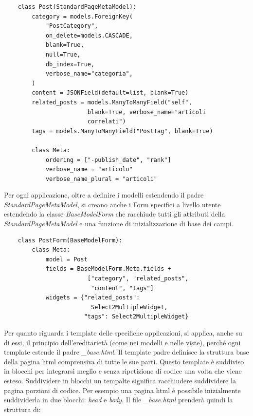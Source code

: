 \documentclass[12pt,a4paper]{article}
\begin{document}
\begin{verbatim}
    class Post(StandardPageMetaModel):
        category = models.ForeignKey(
            "PostCategory",
            on_delete=models.CASCADE,
            blank=True,
            null=True,
            db_index=True,
            verbose_name="categoria",
        )
        content = JSONField(default=list, blank=True)
        related_posts = models.ManyToManyField("self",
                        blank=True, verbose_name="articoli
                        correlati")
        tags = models.ManyToManyField("PostTag", blank=True)

        class Meta:
            ordering = ["-publish_date", "rank"]
            verbose_name = "articolo"
            verbose_name_plural = "articoli"
\end{verbatim}
Per ogni applicazione, oltre a definire i modelli estendendo il padre \textit{StandardPageMetaModel}, si creano anche i Form specifici a livello utente estendendo la classe \textit{BaseModelForm} che racchiude tutti gli attributi della \textit{StandardPageMetaModel} e una funzione di inizializzazione di base dei campi.

\begin{verbatim}
    class PostForm(BaseModelForm):
        class Meta:
            model = Post
            fields = BaseModelForm.Meta.fields +
                        ["category", "related_posts",
                         "content", "tags"]
            widgets = {"related_posts":
                         Select2MultipleWidget,
                       "tags": Select2MultipleWidget}
\end{verbatim}

Per quanto riguarda i template delle specifiche applicazioni, si applica, anche su di essi, il principio dell'ereditarietà (come nei modelli e nelle viste), perché ogni template estende il padre \textit{\_base.html}. Il template padre definisce la struttura base della pagina html comprensiva di tutte le sue parti. Questo template è suddiviso in blocchi per integrarsi meglio e senza ripetizione di codice una volta che viene esteso. Suddividere in blocchi un tempalte significa racchiudere suddividere la pagina porzioni di codice. Per esempio una pagina html è possibile inizialmente suddividerla in due blocchi: \textit{head} e \textit{body}. Il file \textit{\_base.html} prenderà quindi la struttura di:
\end{document}

